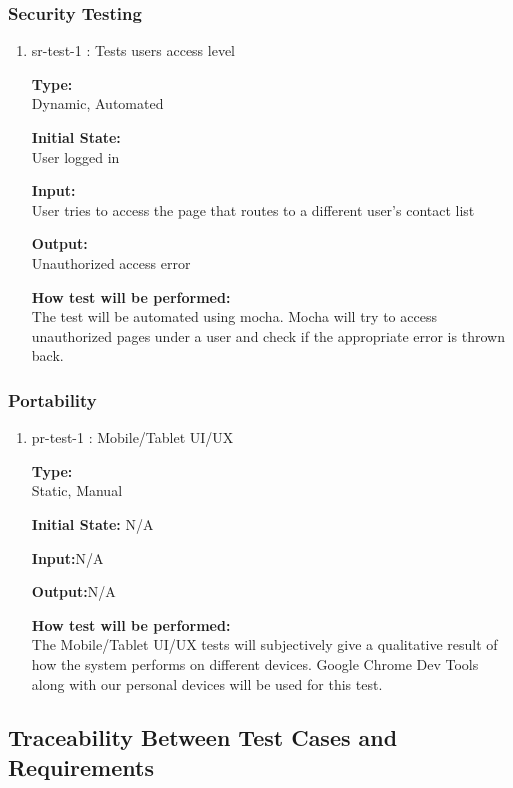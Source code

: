 \documentclass[12pt, titlepage]{article}
\begin{document}
\subsubsection{Security Testing}
\begin{enumerate}
\item{sr-test-1 : Tests users access level\\}

\textbf{Type:}\\ Dynamic, Automated
					
\textbf{Initial State:}\\ User logged in
					
\textbf{Input:}\\ User tries to access the page that routes to a different user's contact list
					
\textbf{Output:}\\ Unauthorized access error
					
\textbf{How test will be performed:}\\ 
The test will be automated using mocha. Mocha will try to access unauthorized pages under a user and check if the appropriate error is thrown back.
\end{enumerate}

\subsubsection{Portability}
\begin{enumerate}
\item{pr-test-1 : Mobile/Tablet UI/UX\\}

\textbf{Type:}\\ Static, Manual
					
\textbf{Initial State:} N/A
					
\textbf{Input:}N/A
					
\textbf{Output:}N/A
					
\textbf{How test will be performed:}\\ 
The Mobile/Tablet UI/UX tests will subjectively give a qualitative result of how the system performs on different devices. Google Chrome Dev Tools along with our personal devices will be used for this test.
\end{enumerate}


\subsection{Traceability Between Test Cases and Requirements}
\end{document}
